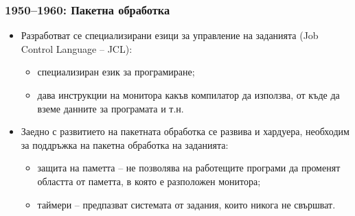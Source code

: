 \documentclass[ignorenonframetext, hyperref=unicode]{beamer}
\begin{document}
\begin{frame}
\frametitle{1950--1960: Пакетна обработка}
\begin{itemize}
  \item Разработват се специализирани езици за управление на заданията (Job
  Control Language -- JCL):
  \begin{itemize}
    \item специализиран език за програмиране;
    \item дава инструкции на монитора какъв компилатор да използва, от къде да
    вземе данните за програмата и т.н.
  \end{itemize}
  \item Заедно с развитието на пакетната обработка се развива и хардуера,
  необходим за поддръжка на пакетна обработка на заданията:
  \begin{itemize}
    \item защита на паметта -- не позволява на работещите програми да променят
    областта от паметта, в която е разположен монитора;
    \item таймери -- предпазват системата от задания, които никога не свършват.
  \end{itemize}
\end{itemize}
\end{frame}
\end{document}
